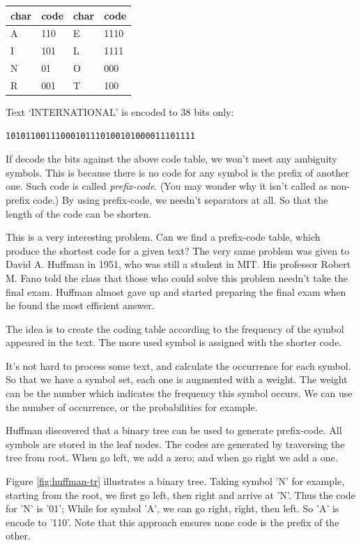 \documentclass[UTF8]{article}
\begin{document}
\begin{tabular}{l|l||l|l}
char & code & char & code \\
\hline
A & 110 & E & 1110 \\
I & 101 & L & 1111 \\
N & 01 & O & 000 \\
R & 001 & T & 100 \\
\hline
\end{tabular}

Text `INTERNATIONAL' is encoded to 38 bits only:

\begin{verbatim}
10101100111000101110100101000011101111
\end{verbatim}

If decode the bits against the above code table, we won't meet any ambiguity symbols.
This is because there is no code for any symbol is the prefix of another one. Such
code is called {\em prefix-code}. (You may wonder why it isn't called as non-prefix code.)
By using prefix-code, we needn't separators at all. So that the length of the code
can be shorten.

This is a very interesting problem. Can we find a prefix-code table, which produce
the shortest code for a given text? The very same problem was given to David A. Huffman
in 1951, who was still a student in MIT\cite{Huffman}. His professor Robert M. Fano
told the class that those who could solve this problem needn't take the final exam.
Huffman almost gave up and started preparing the final exam when he found the most
efficient answer.

The idea is to create the coding table according to the frequency of the symbol appeared
in the text. The more used symbol is assigned with the shorter code.

It's not hard to process some text, and calculate the occurrence for each symbol.
So that we have a symbol set, each one is augmented with a weight. The weight can
be the number which indicates the frequency this symbol occurs. We can use the
number of occurrence, or the probabilities for example.

Huffman discovered that a binary tree can be used to generate prefix-code. All
symbols are stored in the leaf nodes. The codes are generated by traversing
the tree from root. When go left, we add a zero; and when go right we add a one.

Figure \ref{fig:huffman-tr} illustrates a binary tree. Taking symbol 'N' for example,
starting from the root, we first go left, then right and arrive at 'N'. Thus the
code for 'N' is '01'; While for symbol 'A', we can go right, right, then left.
So 'A' is encode to '110'. Note that this approach ensures none code is the prefix
of the other.
\end{document}
